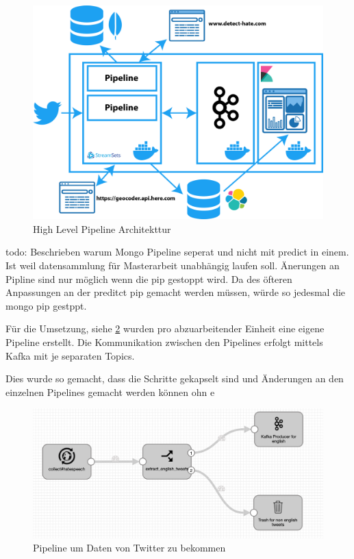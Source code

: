 \begin{figure}[H]
	\centering
		\includegraphics[scale=0.4 ]{images/architecktur_high_level.png}
	\caption{High Level Pipeline Architekttur}
	\label{fig:high_level_architecure}
\end{figure}


todo: Beschrieben warum Mongo Pipeline seperat und nicht mit predict in einem. Ist weil datensammlung für Masterarbeit unabhängig laufen soll. Änerungen an Pipline sind nur möglich wenn die pip  gestoppt  wird. Da des öfteren Anpassungen an der preditct pip gemacht werden müssen, würde so jedesmal die mongo pip gestppt.

Für die Umsetzung, siehe \ref{fig:high_level_architecure} wurden pro abzuarbeitender Einheit eine eigene Pipeline erstellt. Die Kommunikation zwischen den Pipelines erfolgt mittels Kafka mit je separaten Topics. 

Dies wurde so gemacht, dass die Schritte gekapselt sind und Änderungen an den einzelnen Pipelines gemacht werden können ohn e 


\begin{figure}[H]
	\centering
		\includegraphics[scale=0.4 ]{images/collect_tweets.png}
	\caption{Pipeline um Daten von Twitter zu bekommen}
	\label{fig:high_level_architecure}
\end{figure}

